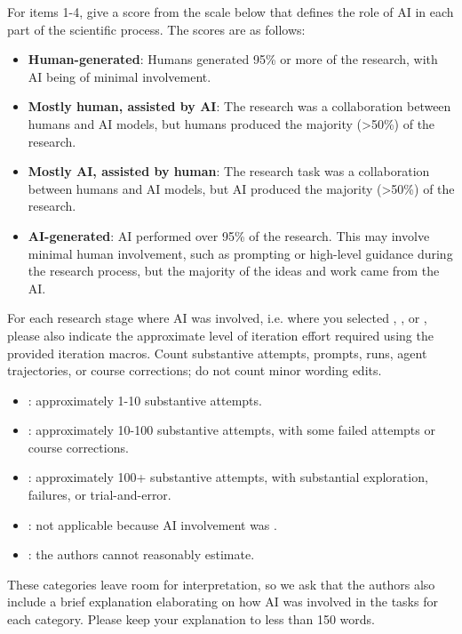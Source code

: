 \documentclass{article}
\begin{document}
For items 1-4, give a score from the scale below that defines the role of AI in each part of the scientific process. The scores are as follows:

\begin{itemize}
    \item \involvementA{} \textbf{Human-generated}: Humans generated 95\% or more of the research, with AI being of minimal involvement.
    \item \involvementB{} \textbf{Mostly human, assisted by AI}: The research was a collaboration between humans and AI models, but humans produced the majority (>50\%) of the research.
    \item \involvementC{} \textbf{Mostly AI, assisted by human}: The research task was a collaboration between humans and AI models, but AI produced the majority (>50\%) of the research.
    \item \involvementD{} \textbf{AI-generated}: AI performed over 95\% of the research. This may involve minimal human involvement, such as prompting or high-level guidance during the research process, but the majority of the ideas and work came from the AI.
\end{itemize}

For each research stage where AI was involved, i.e. where you selected \involvementB{}, \involvementC{}, or \involvementD{}, please also indicate the approximate level of iteration effort required using the provided iteration macros. Count substantive attempts, prompts, runs, agent trajectories, or course corrections; do not count minor wording edits.

\begin{itemize}
    \item \iterationLow{}: approximately 1-10 substantive attempts.
    \item \iterationMedium{}: approximately 10-100 substantive attempts, with some failed attempts or course corrections.
    \item \iterationHigh{}: approximately 100+ substantive attempts, with substantial exploration, failures, or trial-and-error.
    \item \iterationNA{}: not applicable because AI involvement was \involvementA{}.
    \item \iterationUnclear{}: the authors cannot reasonably estimate.
\end{itemize}

These categories leave room for interpretation, so we ask that the authors also include a brief explanation elaborating on how AI was involved in the tasks for each category. Please keep your explanation to less than 150 words.
\end{document}
